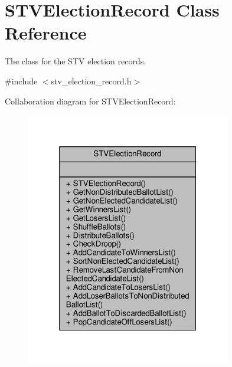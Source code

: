 \hypertarget{classSTVElectionRecord}{}\section{S\+T\+V\+Election\+Record Class Reference}
\label{classSTVElectionRecord}


The class for the S\+TV election records.  




{\ttfamily \#include $<$stv\+\_\+election\+\_\+record.\+h$>$}



Collaboration diagram for S\+T\+V\+Election\+Record\+:
\nopagebreak
\begin{figure}[H]
\begin{center}
\leavevmode
\includegraphics[width=253pt]{classSTVElectionRecord__coll__graph}
\end{center}
\end{figure}
